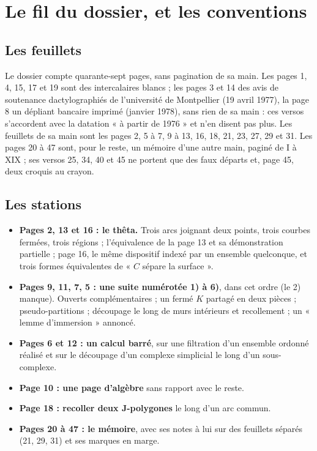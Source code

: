 \documentclass[11pt,a4paper]{article}
\begin{document}
\section*{Le fil du dossier, et les conventions}

\subsection*{Les feuillets}

Le dossier compte quarante-sept pages, sans pagination de sa main. Les pages
1, 4, 15, 17 et 19 sont des intercalaires blancs ; les pages 3 et 14 des avis
de soutenance dactylographiés de l'université de Montpellier (19 avril 1977),
la page 8 un dépliant bancaire imprimé (janvier 1978), sans rien de sa main :
ces versos s'accordent avec la datation « à partir de 1976 » et n'en disent
pas plus. Les feuillets de sa main sont les pages 2, 5 à 7, 9 à 13, 16, 18,
21, 23, 27, 29 et 31. Les pages 20 à 47 sont, pour le reste, un mémoire d'une
autre main, paginé de I à XIX ; ses versos 25, 34, 40 et 45 ne portent que des
faux départs et, page 45, deux croquis au crayon.

\subsection*{Les stations}

\begin{itemize}
  \item \textbf{Pages 2, 13 et 16 : le thêta.} Trois arcs joignant deux points,
    trois courbes fermées, trois régions ; l'équivalence de la page 13 et sa
    démonstration partielle ; page 16, le même dispositif indexé par un
    ensemble quelconque, et trois formes équivalentes de « $C$ sépare la
    surface ».
  \item \textbf{Pages 9, 11, 7, 5 : une suite numérotée 1) à 6)}, dans cet
    ordre (le 2) manque). Ouverts complémentaires ; un fermé $K$ partagé en
    deux pièces ; pseudo-partitions ; découpage le long de murs intérieurs et
    recollement ; un « lemme d'immersion » annoncé.
  \item \textbf{Pages 6 et 12 : un calcul barré}, sur une filtration d'un
    ensemble ordonné réalisé et sur le découpage d'un complexe simplicial le
    long d'un sous-complexe.
  \item \textbf{Page 10 : une page d'algèbre} sans rapport avec le reste.
  \item \textbf{Page 18 : recoller deux J-polygones} le long d'un arc commun.
  \item \textbf{Pages 20 à 47 : le mémoire}, avec ses notes à lui sur des
    feuillets séparés (21, 29, 31) et ses marques en marge.
\end{itemize}
\end{document}
